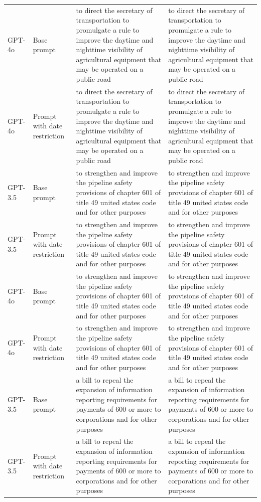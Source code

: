 \begin{longtable}{>{\raggedright\arraybackslash}p{1.4cm}>{\raggedright\arraybackslash}p{1.4cm}>{\raggedright\arraybackslash}p{5.5cm}>{\raggedright\arraybackslash}p{5.5cm}}
GPT-4o & Base prompt & to direct the secretary of transportation to promulgate a rule to improve the daytime and nighttime visibility of agricultural equipment that may be operated on a public road & to direct the secretary of transportation to promulgate a rule to improve the daytime and nighttime visibility of agricultural equipment that may be operated on a public road\\
GPT-4o & Prompt with date restriction & to direct the secretary of transportation to promulgate a rule to improve the daytime and nighttime visibility of agricultural equipment that may be operated on a public road & to direct the secretary of transportation to promulgate a rule to improve the daytime and nighttime visibility of agricultural equipment that may be operated on a public road\\
GPT-3.5 & Base prompt & to strengthen and improve the pipeline safety provisions of chapter 601 of title 49 united states code and for other purposes & to strengthen and improve the pipeline safety provisions of chapter 601 of title 49 united states code and for other purposes\\
GPT-3.5 & Prompt with date restriction & to strengthen and improve the pipeline safety provisions of chapter 601 of title 49 united states code and for other purposes & to strengthen and improve the pipeline safety provisions of chapter 601 of title 49 united states code and for other purposes\\
GPT-4o & Base prompt & to strengthen and improve the pipeline safety provisions of chapter 601 of title 49 united states code and for other purposes & to strengthen and improve the pipeline safety provisions of chapter 601 of title 49 united states code and for other purposes\\
GPT-4o & Prompt with date restriction & to strengthen and improve the pipeline safety provisions of chapter 601 of title 49 united states code and for other purposes & to strengthen and improve the pipeline safety provisions of chapter 601 of title 49 united states code and for other purposes\\
GPT-3.5 & Base prompt & a bill to repeal the expansion of information reporting requirements for payments of 600 or more to corporations and for other purposes & a bill to repeal the expansion of information reporting requirements for payments of 600 or more to corporations and for other purposes\\
GPT-3.5 & Prompt with date restriction & a bill to repeal the expansion of information reporting requirements for payments of 600 or more to corporations and for other purposes & a bill to repeal the expansion of information reporting requirements for payments of 600 or more to corporations and for other purposes\\

\end{longtable}

